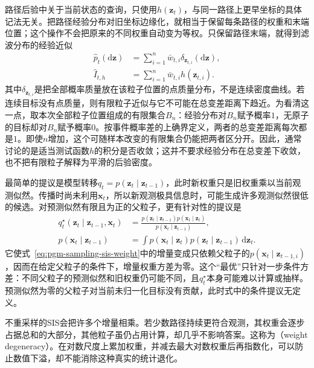 路径后验中关于当前状态的查询，只使用$h(\bm z_t)$，与同一路径上更早坐标的具体记法无关。把路径经验分布对旧坐标边缘化，就相当于保留每条路径的权重和末端位置；这个操作不会把原来的不同权重自动变为等权。只保留路径末端，就得到滤波分布的经验近似
\begin{equation}
  \begin{aligned}
    \widehat p_t(\mathrm{d}\bm{z})
      &=\sum_{i=1}^{n}\bar w_{t,i}\delta_{\bm{z}_{t,i}}(\mathrm{d}\bm{z}),\\
    \widehat I_{t,h}&=\sum_{i=1}^{n}\bar w_{t,i}h(\bm{z}_{t,i}).
  \end{aligned}
  \label{eq:pgm-sampling-particle-measure}
\end{equation}
其中$\delta_{\bm{z}_{t,i}}$是把全部概率质量放在该粒子位置的点质量分布，不是连续密度曲线。若连续目标没有点质量，则有限粒子近似与它不可能在总变差距离下趋近。为看清这一点，取本次全部粒子位置组成的有限集合$B_n$：经验分布对$B_n$赋予概率$1$，无原子的目标却对$B_n$赋予概率$0$。按事件概率差的上确界定义，两者的总变差距离每次都是$1$。即使$n$增加，这个可随样本改变的有限集合仍能把两者区分开。因此，通常讨论的是适当测试函数$h$的积分是否收敛；这并不要求经验分布在总变差下收敛，也不把有限粒子解释为平滑的后验密度。

最简单的提议是模型转移$q_t=p(\bm{z}_t\mid\bm{z}_{t-1})$，此时新权重只是旧权重乘以当前观测似然。传播时尚未利用$\bm{x}_t$，所以新观测极具信息时，可能生成许多观测似然很低的候选。对预测似然有限且为正的父粒子，更有针对性的提议是
\begin{equation}
  \begin{aligned}
    q_t^\star(\bm{z}_t\mid\bm{z}_{t-1},\bm{x}_t)
      &=\frac{p(\bm{z}_t\mid\bm{z}_{t-1})
                p(\bm{x}_t\mid\bm{z}_t)}
              {p(\bm{x}_t\mid\bm{z}_{t-1})},\\
    p(\bm{x}_t\mid\bm{z}_{t-1})
      &=\int p(\bm{x}_t\mid\bm{z}_t)
             p(\bm{z}_t\mid\bm{z}_{t-1})\,\mathrm{d}\bm{z}_t.
  \end{aligned}
  \label{eq:pgm-sampling-optimal-proposal}
\end{equation}
它使式~\eqref{eq:pgm-sampling-sis-weight}中的增量变成只依赖父粒子的$p(\bm{x}_t\mid\bm{z}_{t-1,i})$，因而在给定父粒子的条件下，增量权重方差为零。这个“最优”只针对一步条件方差：不同父粒子的预测似然和旧权重仍可能不同，且$q_t^\star$本身可能难以计算或抽样。预测似然为零的父粒子对当前未归一化目标没有贡献，此时式中的条件提议无定义。

不重采样的SIS会把许多个增量相乘。若少数路径持续更符合观测，其权重会逐步占据总和的大部分，其他粒子虽仍占用计算，却几乎不影响答案。这称为（weight degeneracy）。在对数尺度上累加权重，并减去最大对数权重后再指数化，可以防止数值下溢，却不能消除这种真实的统计退化。

